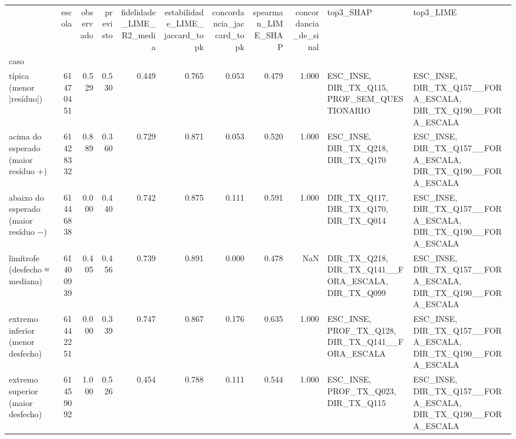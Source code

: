 \begin{tabular}{lrrrrrrrrll}
\toprule
 & escola & observado & previsto & fidelidade\_LIME\_R2\_media & estabilidade\_LIME\_jaccard\_topk & concordancia\_jaccard\_topk & spearman\_LIME\_SHAP & concordancia\_de\_sinal & top3\_SHAP & top3\_LIME \\
caso &  &  &  &  &  &  &  &  &  &  \\
\midrule
típica (menor |resíduo|) & 61470451 & 0.529 & 0.530 & 0.449 & 0.765 & 0.053 & 0.479 & 1.000 & ESC\_INSE, DIR\_TX\_Q115, PROF\_SEM\_QUESTIONARIO & ESC\_INSE, DIR\_TX\_Q157\_\_FORA\_ESCALA, DIR\_TX\_Q190\_\_FORA\_ESCALA \\
acima do esperado (maior resíduo +) & 61428332 & 0.889 & 0.360 & 0.729 & 0.871 & 0.053 & 0.520 & 1.000 & ESC\_INSE, DIR\_TX\_Q218, DIR\_TX\_Q170 & ESC\_INSE, DIR\_TX\_Q157\_\_FORA\_ESCALA, DIR\_TX\_Q190\_\_FORA\_ESCALA \\
abaixo do esperado (maior resíduo −) & 61446838 & 0.000 & 0.440 & 0.742 & 0.875 & 0.111 & 0.591 & 1.000 & DIR\_TX\_Q117, DIR\_TX\_Q170, DIR\_TX\_Q014 & ESC\_INSE, DIR\_TX\_Q157\_\_FORA\_ESCALA, DIR\_TX\_Q190\_\_FORA\_ESCALA \\
limítrofe (desfecho ≈ mediana) & 61400939 & 0.405 & 0.456 & 0.739 & 0.891 & 0.000 & 0.478 & NaN & DIR\_TX\_Q218, DIR\_TX\_Q141\_\_FORA\_ESCALA, DIR\_TX\_Q099 & ESC\_INSE, DIR\_TX\_Q157\_\_FORA\_ESCALA, DIR\_TX\_Q190\_\_FORA\_ESCALA \\
extremo inferior (menor desfecho) & 61442251 & 0.000 & 0.339 & 0.747 & 0.867 & 0.176 & 0.635 & 1.000 & ESC\_INSE, PROF\_TX\_Q128, DIR\_TX\_Q141\_\_FORA\_ESCALA & ESC\_INSE, DIR\_TX\_Q157\_\_FORA\_ESCALA, DIR\_TX\_Q190\_\_FORA\_ESCALA \\
extremo superior (maior desfecho) & 61459092 & 1.000 & 0.526 & 0.454 & 0.788 & 0.111 & 0.544 & 1.000 & ESC\_INSE, PROF\_TX\_Q023, DIR\_TX\_Q115 & ESC\_INSE, DIR\_TX\_Q157\_\_FORA\_ESCALA, DIR\_TX\_Q190\_\_FORA\_ESCALA \\
\bottomrule
\end{tabular}

